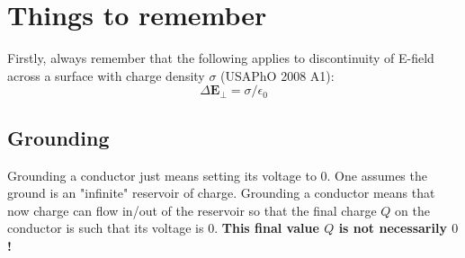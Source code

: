\section{Things to remember}
Firstly, always remember that the following applies to discontinuity of E-field across a surface with charge density $\sigma$ (USAPhO 2008 A1):
\begin{equation}
    \Delta \mathbf{E}_\perp=\sigma/\epsilon_0
\end{equation}

\subsection{Grounding}
Grounding a conductor just means setting its voltage to $0$. One assumes the ground is an "infinite" reservoir of charge. Grounding a conductor means that now charge can flow in/out of the reservoir so that the final charge $Q$ on the conductor is such that its voltage is $0$. \textbf{This final value $Q$ is not necessarily $0$!}
